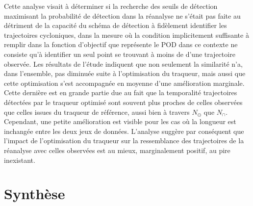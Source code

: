 \documentclass[../main.tex]{subfiles}
\begin{document}
Cette analyse visait à déterminer si la recherche des seuils de détection maximisant la probabilité de détection dans la réanalyse ne s'était pas faite au
détriment de la capacité du schéma de détection à fidèlement identifier les trajectoires cycloniques, dans la mesure où la condition implicitement suffisante à
remplir dans la fonction d'objectif que représente le POD dans ce contexte ne consiste qu'à identifier un seul point se trouvant à moins de  d'une
trajectoire observée. Les résultats de l'étude indiquent que non seulement la similarité n'a, dans l'ensemble, pas diminuée suite à l'optimisation du traqueur,
mais aussi que cette optimisation s'est accompagnée en moyenne d'une amélioration marginale. Cette dernière est en grande partie due au fait que la temporalité
trajectoires détectées par le traqueur optimisé sont souvent plus proches de celles observées que celles issues du traqueur de référence, aussi bien à travers
$N_\ominus$ que $N_\cap$. Cependant, une petite amélioration est visible pour les cas où la longueur est inchangée entre les deux jeux de données. L'analyse
suggère par conséquent que l'impact de l'optimisation du traqueur sur la ressemblance des trajectoires de la réanalyse avec celles observées est au mieux,
marginalement positif, au pire inexistant.

\section{Synthèse}
\end{document}
